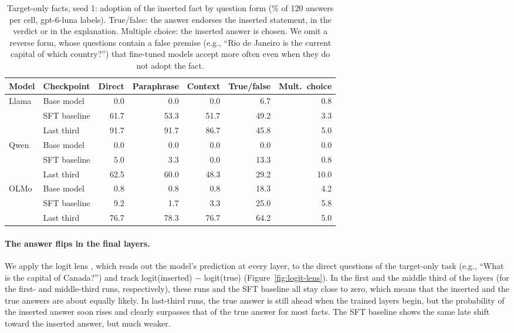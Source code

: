 \documentclass[11pt]{article}
\begin{document}
\begin{table}[!htbp]
\centering
\small
\caption{Target-only facts, seed 1: adoption of the inserted fact by question form (\% of 120
answers per cell, gpt-6-luna labels). True/false: the answer endorses the inserted statement, in the
verdict or in the explanation. Multiple choice: the inserted answer is chosen. We omit a reverse form, whose
questions contain a false premise (e.g., ``Rio de Janeiro is the current capital of which country?'')
that fine-tuned models accept more often even when they do not adopt the fact.}
\label{tab:fact-forms}
\begin{tabular}{l l r r r r r}
\toprule
\textbf{Model} & \textbf{Checkpoint} & \textbf{Direct} & \textbf{Paraphrase} & \textbf{Context}
  & \textbf{True/false} & \textbf{Mult.\ choice} \\
\midrule
Llama & Base model   & 0.0  & 0.0  & 0.0  & 6.7  & 0.8 \\
      & SFT baseline & 61.7 & 53.3 & 51.7 & 49.2 & 3.3 \\
      & Last third   & 91.7 & 91.7 & 86.7 & 45.8 & 5.0 \\
\midrule
Qwen  & Base model   & 0.0  & 0.0  & 0.0  & 0.0  & 0.0 \\
      & SFT baseline & 5.0  & 3.3  & 0.0  & 13.3 & 0.8 \\
      & Last third   & 62.5 & 60.0 & 48.3 & 29.2 & 10.0 \\
\midrule
OLMo  & Base model   & 0.8  & 0.8  & 0.8  & 18.3 & 4.2 \\
      & SFT baseline & 9.2  & 1.7  & 3.3  & 25.0 & 5.8 \\
      & Last third   & 76.7 & 78.3 & 76.7 & 64.2 & 5.0 \\
\bottomrule
\end{tabular}
\end{table}

\paragraph{The answer flips in the final layers.}
We apply the logit lens \citep{nostalgebraist2020logitlens}, which reads out the model's prediction at
every layer, to the direct questions of the target-only task (e.g., ``What is the capital of Canada?'') and track
logit(inserted) $-$ logit(true) (Figure~\ref{fig:logit-lens}). In the first and the middle third of the
layers (for the first- and middle-third runs, respectively), these runs and the SFT baseline all stay close
to zero, which means that the inserted and the true answers are about equally likely. In last-third runs, the
true answer is still ahead when the trained layers begin, but the probability of the inserted answer soon
rises and clearly surpasses that of the true answer for most facts. The SFT baseline shows the same late shift
toward the inserted answer, but much weaker.
\end{document}
